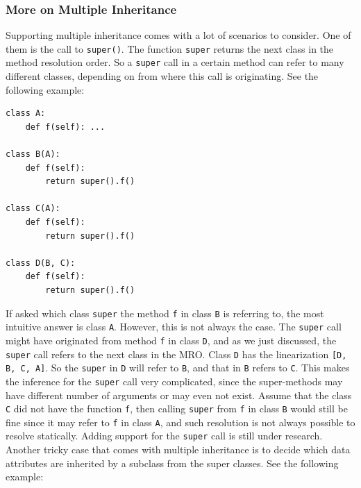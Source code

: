 \subsubsection{More on Multiple Inheritance}\label{more_mult}
Supporting multiple inheritance comes with a lot of scenarios to consider. One of them is the call to \lstinline|super()|. The function \lstinline|super| returns the next class in the method resolution order. So a \lstinline|super| call in a certain method can refer to many different classes, depending on from where this call is originating. See the following example:
\begin{lstlisting}
class A:
	def f(self): ...
		
class B(A):
	def f(self):
		return super().f()
	
class C(A):
	def f(self):
		return super().f()

class D(B, C):
	def f(self):
		return super().f()
\end{lstlisting}

If asked which class \lstinline|super| the method \lstinline|f| in class \lstinline|B| is referring to, the most intuitive answer is class \lstinline|A|. However, this is not always the case. The \lstinline|super| call might have originated from method \lstinline|f| in class \lstinline|D|, and as we just discussed, the \lstinline|super| call refers to the next class in the MRO. Class \lstinline|D| has the linearization \lstinline|[D, B, C, A]|. So the \lstinline|super| in \lstinline|D| will refer to \lstinline|B|, and that in \lstinline|B| refers to \lstinline|C|. This makes the inference for the \lstinline|super| call very complicated, since the super-methods may have different number of arguments or may even not exist. Assume that the class \lstinline|C| did not have the function \lstinline|f|, then calling \lstinline|super| from \lstinline|f| in class \lstinline|B| would still be fine since it may refer to \lstinline|f| in class \lstinline|A|, and such resolution is not always possible to resolve statically. Adding support for the \lstinline|super| call is still under research.\\

Another tricky case that comes with multiple inheritance is to decide which data attributes are inherited by a subclass from the super classes. See the following example:


